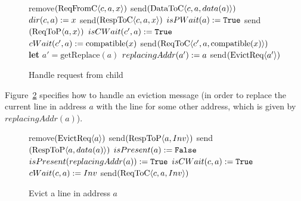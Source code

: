 \begin{figure}
\begin{algorithmic}
           \State remove$(\text{ReqFromC$\langle c,a,x\rangle$})$
              \State send$(\text{DataToC$\langle c,a,data(a)\rangle$})$
           \EndIf
           \State $dir(c, a) := x$
           \State send$(\text{RespToC$\langle c,a,x\rangle$})$
        \Else
              \State $isPWait(a) := \texttt{True}$
              \State send$(\text{ReqToP$\langle a,x\rangle$})$
           \EndIf
                 \State $isCWait(c', a) := \texttt{True}$
                 \State $cWait(c', a) := \text{compatible}(x)$
                 \State send$(\text{ReqToC$\langle c',a,\text{compatible}(x)\rangle$})$
              \EndIf
           \EndFor
        \EndIf
     \EndIf
  \Else
     \State \textbf{let} $a' = \text{getReplace}(a)$
        \State $replacingAddr(a') := a$
        \State send$(\text{EvictReq$\langle a'\rangle$})$
     \EndIf
  \EndIf
\EndFunction
\end{algorithmic}
\caption{Handle request from child}
\label{alg:handleCReq}
\end{figure}

Figure~\ref{alg:handleEvict} specifies how to handle an eviction message (in
order to replace the current line in address $a$ with the line for some other
address, which is given by $replacingAddr(a)$).
\begin{figure}
\begin{algorithmic}
      \State remove$(\text{EvictReq$\langle a\rangle$})$
         \State send$(\text{RespToP$\langle a,Inv\rangle$})$
            \State send$(\text{RespToP$\langle a,data(a)\rangle$})$
         \EndIf
      \EndIf
      \State $isPresent(a) := \texttt{False}$
      \State $isPresent(replacingAddr(a)) := \texttt{True}$
   \Else
               \State $isCWait(c, a) := \texttt{True}$
               \State $cWait(c, a) := Inv$
               \State send$(\text{ReqToC$\langle c,a,Inv\rangle$})$
            \EndIf
         \EndFor
      \EndIf
   \EndIf
\EndFunction
\end{algorithmic}
\caption{Evict a line in address $a$}
\label{alg:handleEvict}
\end{figure}

